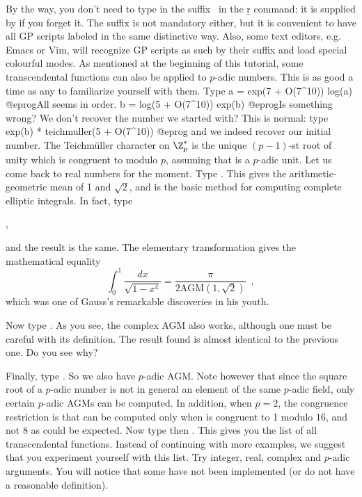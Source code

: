By the way, you don't need to type in the suffix~ in the \b{r}
command: it is supplied by  if you forget it. The suffix is not
mandatory either, but it is convenient to have all GP scripts labeled in the
same distinctive way. Also, some text editors, e.g. Emacs or Vim, will
recognize GP scripts as such by their suffix and load special colourful
modes. \medskip
%
As mentioned at the beginning of this tutorial, some transcendental functions
can also be applied to $p$-adic numbers. This is as good a time as any to
familiarize yourself with them. Type
\bprog
  a = exp(7 + O(7^10))
  log(a)
@eprog\noindent All seems in order.
\bprog
  b = log(5 + O(7^10))
  exp(b)
@eprog\noindent Is something wrong? We don't recover the number we started
with? This is normal: type
\bprog
  exp(b) * teichmuller(5 + O(7^10))
@eprog\noindent
and we indeed recover our initial number. The Teichm\"uller
character  on $\Z_p^*$ is the unique \hbox{$(p-1)$-st}
root of unity which is congruent to  modulo $p$, assuming that 
is a $p$-adic unit.\smallskip
%
Let us come back to real numbers for the moment. Type .
This gives the arithmetic-geometric mean of 1 and $\sqrt2$, and is the basic
method for computing complete elliptic integrals. In fact, type

,

\noindent and the result is the same. The elementary transformation
 gives the mathematical equality
$$\int_0^1 \dfrac{dx}{\sqrt{1-x^4}} = \dfrac{\pi}{2\text{AGM}(1,\sqrt2)}
\enspace,$$
which was one of Gauss's remarkable discoveries in his youth.

Now type . As you see, the complex AGM also works,
although one must be careful with its definition. The result found is
almost identical to the previous one. Do you see why?

Finally, type . So we also have $p$-adic
AGM. Note however that since the square root of a $p$-adic number is not
in general an element of the same $p$-adic field,
only certain $p$-adic AGMs can be computed. In addition,
when $p=2$, the congruence restriction is that  can be computed
only when  is congruent to 1 modulo $16$, and not 8 as could be
expected.\smallskip
%
Now type  then . This gives you the list of all transcendental functions.
Instead of continuing with more examples, we suggest that you experiment
yourself with this list. Try integer, real, complex and $p$-adic arguments.
You will notice that some have not been implemented (or do not have a
reasonable definition).


